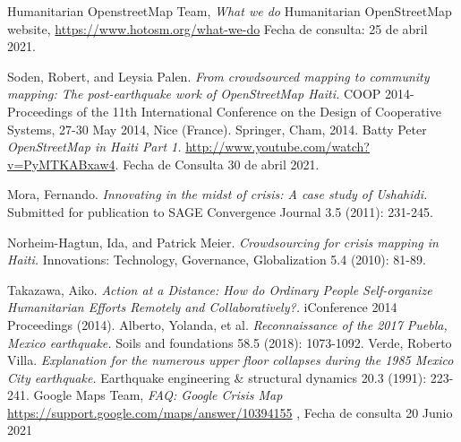 \begin{thebibliography}{1}
   Humanitarian OpenstreetMap Team, {\em What we do} Humanitarian OpenStreetMap website, \url{https://www.hotosm.org/what-we-do} Fecha de consulta: 25 de abril 2021.

   Soden, Robert, and Leysia Palen. {\em From crowdsourced mapping to community mapping: The post-earthquake work of OpenStreetMap Haiti.} COOP 2014-Proceedings of the 11th International Conference on the Design of Cooperative Systems, 27-30 May 2014, Nice (France). Springer, Cham, 2014.
   Batty Peter  {\em OpenStreetMap in Haiti Part 1.} \url{http://www.youtube.com/watch?v=PyMTKABxaw4}. Fecha de Consulta 30 de abril 2021.

   Mora, Fernando. {\em Innovating in the midst of crisis: A case study of Ushahidi.} Submitted for publication to SAGE Convergence Journal 3.5 (2011): 231-245.

   Norheim-Hagtun, Ida, and Patrick Meier. {\em Crowdsourcing for crisis mapping in Haiti.} Innovations: Technology, Governance, Globalization 5.4 (2010): 81-89.

   Takazawa, Aiko. {\em Action at a Distance: How do Ordinary People Self-organize Humanitarian Efforts Remotely and Collaboratively?.} iConference 2014 Proceedings (2014).
     Alberto, Yolanda, et al. {\em Reconnaissance of the 2017 Puebla, Mexico earthquake.} Soils and foundations 58.5 (2018): 1073-1092.
   Verde, Roberto Villa. {\em Explanation for the numerous upper floor collapses during the 1985 Mexico City earthquake.} Earthquake engineering \& structural dynamics 20.3 (1991): 223-241.
 Google Maps Team, {\em FAQ: Google Crisis Map}  \url{https://support.google.com/maps/answer/10394155} , Fecha de consulta 20 Junio 2021
\end{thebibliography}
